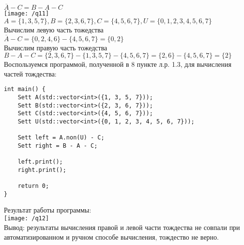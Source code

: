 \documentclass[a4paper,14pt]{extarticle}
\begin{document}
	
		$\overline{A}-C=B-A-C$\\
		\texttt{[image: /q11]}\\
		$A = \{1,3,5,7\}, B = \{2, 3, 6, 7\}, C = \{4, 5, 6, 7\}, U = \{0, 1, 2, 3, 4, 5, 6, 7\}$\\
		Вычислим левую часть тожедства\\
		$\overline{A}-C = \{0, 2, 4, 6\} - \{4, 5, 6, 7\}=\{0, 2\}$\\
		Вычислим правую часть тожедства\\
		$B-A-C = \{2, 3, 6, 7\} - \{1,3,5,7\}-\{4, 5, 6, 7\}=\{2, 6\} - \{4, 5, 6, 7\} = \{2\}$\\
		Воспользуемся программой, полученной в 8 пункте л.р. 1.3, для вычисления частей тождества:\\
	\begin{verbatim}
int main() {
	Sett A(std::vector<int>({1, 3, 5, 7}));
	Sett B(std::vector<int>({2, 3, 6, 7}));
	Sett C(std::vector<int>({4, 5, 6, 7}));
	Sett U(std::vector<int>({0, 1, 2, 3, 4, 5, 6, 7}));
	
	Sett left = A.non(U) - C;
	Sett right = B - A - C;
	
	left.print();
	right.print();
	
	return 0;
}
	\end{verbatim}
Результат работы программы:\\
\texttt{[image: /q12]}\\
	Вывод: результаты вычисления правой и левой части тождества не совпали при автоматизированном и ручном способе вычисления, тождество не верно.
\end{document}
